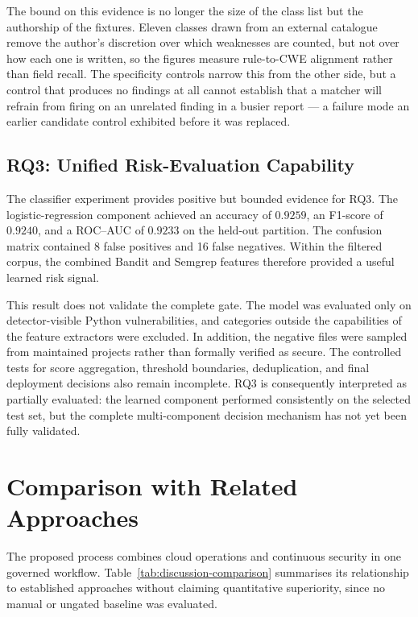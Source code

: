 The bound on this evidence is no longer the size of the class list but the
authorship of the fixtures. Eleven classes drawn from an external catalogue
remove the author's discretion over which weaknesses are counted, but not over
how each one is written, so the figures measure rule-to-CWE alignment rather
than field recall. The specificity controls narrow this from the other side, but
a control that produces no findings at all cannot establish that a matcher will
refrain from firing on an unrelated finding in a busier report --- a failure
mode an earlier candidate control exhibited before it was replaced.

\subsection{RQ3: Unified Risk-Evaluation Capability}
\label{subsec:discussion-rq3}

The classifier experiment provides positive but bounded evidence for RQ3. The
logistic-regression component achieved an accuracy of $0.9259$, an F1-score of $0.9240$,
and a ROC--AUC of $0.9233$ on the held-out partition. The confusion matrix contained 8
false positives and 16 false negatives. Within the filtered corpus, the combined Bandit and Semgrep features therefore
provided a useful learned risk signal.

This result does not validate the complete gate. The model was evaluated only on
detector-visible Python vulnerabilities, and categories outside the capabilities of the
feature extractors were excluded. In addition, the negative files were sampled from
maintained projects rather than formally verified as secure. The controlled tests for
score aggregation, threshold boundaries, deduplication, and final deployment decisions
also remain incomplete. RQ3 is consequently interpreted as partially evaluated: the
learned component performed consistently on the selected test set, but the complete
multi-component decision mechanism has not yet been fully validated.

\section{Comparison with Related Approaches}
\label{sec:discussion-comparison}

The proposed process combines cloud operations and continuous security in one governed
workflow. Table~\ref{tab:discussion-comparison} summarises its relationship to established
approaches without claiming quantitative superiority, since no manual or ungated baseline
was evaluated.

